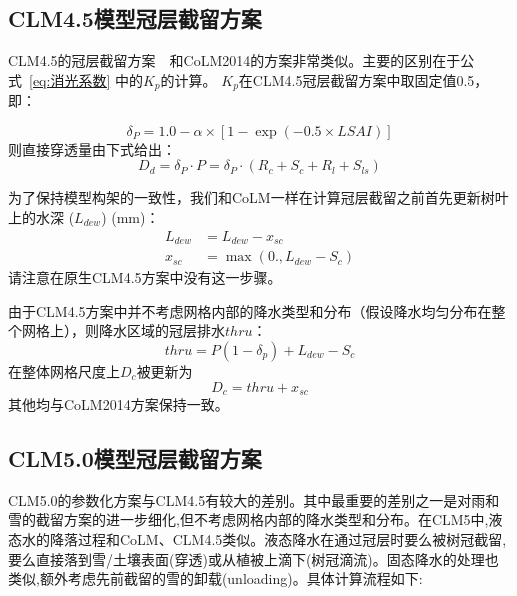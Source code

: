\subsection{CLM4.5模型冠层截留方案}
CLM4.5的冠层截留方案~\citet{oleson2013technical}~和CoLM2014的方案非常类似。主要的区别在于公式~\eqref{eq:消光系数} 中的$K_p$的计算。
$K_p$在CLM4.5冠层截留方案中取固定值0.5，即：

\begin{equation}
\delta_{P}=1.0-\alpha \times\left[1-\exp \left(-0.5 \times LSAI\right)\right]
\end{equation}
则直接穿透量由下式给出：
\begin{equation}
D_{d}=\delta_{P} \cdot P=\delta_{P} \cdot\left(R_{c}+S_{c}+R_{l}+S_{l s}\right)
\end{equation}

为了保持模型构架的一致性，我们和CoLM一样在计算冠层截留之前首先更新树叶上的水深 ($L_{dew}$) (mm)：
\begin{equation}
\begin{aligned}
L_{dew} &= L_{dew}-x_{sc} \\
x_{s c} &= \max \left(0., L_{dew}-S_{c}\right)
\end{aligned}
\end{equation}
请注意在原生CLM4.5方案中没有这一步骤。

由于CLM4.5方案中并不考虑网格内部的降水类型和分布（假设降水均匀分布在整个网格上），则降水区域的冠层排水$thru$：
\begin{equation}
thru=P\left(1-\delta_{p}\right)+L_{dew}-S_{c}
\end{equation}
在整体网格尺度上$D_c$被更新为
\begin{equation}
D_c=thru+x_{s c}
\end{equation}
其他均与CoLM2014方案保持一致。

\subsection{CLM5.0模型冠层截留方案}
CLM5.0的参数化方案与CLM4.5有较大的差别\citep{lawrence2019community}。其中最重要的差别之一是对雨和雪的截留方案的进一步细化,但不考虑网格内部的降水类型和分布。在CLM5中,液态水的降落过程和CoLM、CLM4.5类似。液态降水在通过冠层时要么被树冠截留,要么直接落到雪/土壤表面(穿透)或从植被上滴下(树冠滴流)。固态降水的处理也类似,额外考虑先前截留的雪的卸载(unloading)。具体计算流程如下:

